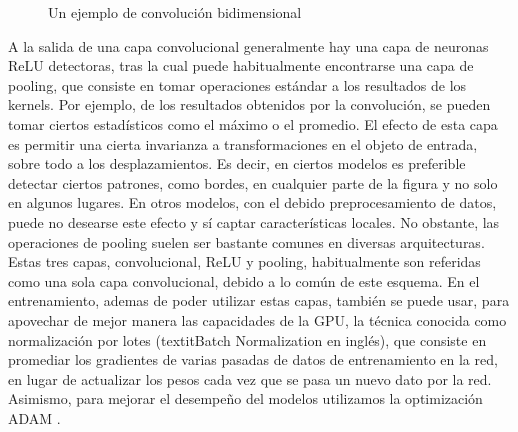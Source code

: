 \documentclass[12pt, spanish]{article}
\begin{document}
\begin{figure}[H]
\caption{Un ejemplo de convolución bidimensional \cite{goodfellow2016deep}}
\label{convolucion}
\end{figure}

A la salida de una capa convolucional generalmente hay una capa de neuronas
ReLU detectoras, tras la cual puede habitualmente encontrarse una capa de
pooling, que consiste en tomar operaciones estándar a los resultados de los
kernels. Por ejemplo, de los resultados obtenidos por la convolución, se
pueden tomar ciertos estadísticos como el máximo o el promedio. El efecto
de esta capa es permitir una cierta invarianza a transformaciones en el
objeto de entrada, sobre todo a los desplazamientos. Es decir, en ciertos
modelos es preferible detectar ciertos patrones, como bordes, en cualquier
parte de la figura y no solo en algunos lugares. En otros modelos, con el
debido preprocesamiento de datos, puede no desearse este efecto y sí captar
características locales. No obstante, las operaciones de pooling suelen ser
bastante comunes en diversas arquitecturas.
Estas tres capas, convolucional, ReLU y pooling, habitualmente son referidas
como una sola capa convolucional, debido a lo común de este esquema.
En el entrenamiento, ademas de poder utilizar estas capas, también se puede
usar, para apovechar de mejor manera las capacidades de la GPU, la técnica
conocida como normalización por lotes (textit{Batch Normalization} en inglés),
que consiste en promediar los gradientes de varias pasadas de datos de
entrenamiento en la red, en lugar de actualizar los pesos cada vez que se pasa
un nuevo dato por la red. 
Asimismo, para mejorar el desempeño del modelos utilizamos la optimización
ADAM \cite{arsalan2017synthesizing}.
\end{document}
